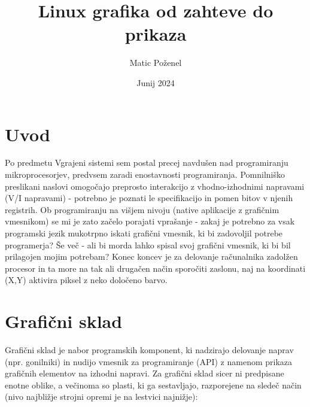 \documentclass{article}
\title{Linux grafika od zahteve do prikaza}
\author{Matic Poženel}
\date{Junij 2024}
\begin{document}
\maketitle

\section{Uvod}
Po predmetu Vgrajeni sistemi sem postal precej navdušen nad programiranju mikroprocesorjev, predvsem zaradi enostavnosti programiranja. Pomnilniško preslikani naslovi omogočajo preprosto interakcijo z vhodno-izhodnimi napravami (V/I napravami) - potrebno je poznati le specifikacijo in pomen bitov v njenih registrih.
Ob programiranju na višjem nivoju (native aplikacije z grafičnim vmesnikom) se mi je zato začelo porajati vprašanje - zakaj je potrebno za vsak programski jezik mukotrpno iskati grafični vmesnik, ki bi zadovoljil potrebe programerja? Še več - ali bi morda lahko spisal svoj grafični vmesnik, ki bi bil prilagojen mojim potrebam? Konec koncev je za delovanje računalnika zadolžen procesor in ta more na tak ali drugačen način sporočiti zaslonu, naj na koordinati (X,Y) aktivira piksel z neko določeno barvo.

\section{Grafični sklad}
Grafični sklad je nabor programskih komponent, ki nadzirajo delovanje naprav (npr. gonilniki) in nudijo vmesnik za programiranje (API) z namenom prikaza grafičnih elementov na izhodni napravi.
Za grafični sklad sicer ni predpisane enotne oblike, a večinoma so plasti, ki ga sestavljajo, razporejene na sledeč način (nivo najbližje strojni opremi je na lestvici najnižje):
\end{document}
